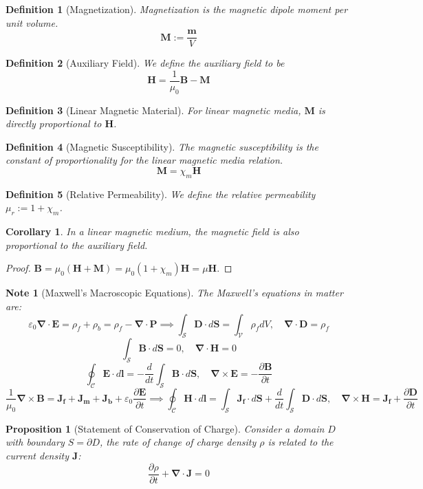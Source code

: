 \documentclass[a4paper]{article}
\newtheorem{defi}{Definition}[section]
\newtheorem{prop}{Proposition}[section]
\newtheorem{cor}{Corollary}[section]
\theoremstyle{new}
\newtheorem{Note}{Note}[section]
\begin{document}
\begin{defi}[Magnetization]
Magnetization is the magnetic dipole moment per unit volume.
$$\mathbf{M}:=\frac{\boldsymbol{m}}{V}$$
\end{defi}
\begin{defi}[Auxiliary Field]
We define the auxiliary field to be
$$\mathbf{H}=\frac{1}{\mu_0}\mathbf{B}-\mathbf{M}$$
\end{defi}
\begin{defi}[Linear Magnetic Material]
For linear magnetic media, $\mathbf{M}$ is directly proportional to $\mathbf{H}$.
\end{defi}
\begin{defi}[Magnetic Susceptibility]
The magnetic susceptibility is the constant of proportionality for the linear magnetic media relation.
$$\mathbf{M}=\chi_m\mathbf{H}$$
\end{defi}
\begin{defi}[Relative Permeability]
We define the relative permeability $\mu_r:=1+\chi_m$.
\end{defi}
\begin{cor}
In a linear magnetic medium, the magnetic field is also proportional to the auxiliary field.
\end{cor}
\begin{proof}
$\mathbf{B}=\mu_0(\mathbf{H}+\mathbf{M})=\mu_0(1+\chi_m)\mathbf{H}=\mu\mathbf{H}$.
\end{proof}
\begin{Note}[Maxwell's Macroscopic Equations]
The Maxwell's equations in matter are:
$$\varepsilon_0\boldsymbol{\nabla}\cdot\mathbf{E}=\rho_f+\rho_b=\rho_f-\boldsymbol{\nabla}\cdot\mathbf{P}\implies\int_{\mathcal{S}}\mathbf{D}\cdot d\mathbf{S}=\int_{\mathcal{V}}\rho_fdV,\quad\boldsymbol{\nabla}\cdot\mathbf{D}=\rho_f$$
$$\int_{\mathcal{S}}\mathbf{B}\cdot d\mathbf{S}=0,\quad \boldsymbol{\nabla}\cdot\mathbf{H}=0$$
$$\oint_{\mathcal{C}}\mathbf{E}\cdot d\mathbf{l}=-\frac{d}{dt}\int_{\mathcal{S}}\mathbf{B}\cdot d\mathbf{S},\quad \boldsymbol{\nabla}\times\mathbf{E}=-\frac{\partial\mathbf{B}}{\partial t}$$
$$\frac{1}{\mu_0}\boldsymbol{\nabla}\times\mathbf{B}=\mathbf{J_f}+\mathbf{J_m}+\mathbf{J_b}+\varepsilon_0\frac{\partial\mathbf{E}}{\partial t}\implies\oint_{\mathcal{C}}\mathbf{H}\cdot d\mathbf{l}=\int_{\mathcal{S}}\mathbf{J_f}\cdot d\mathbf{S}+\frac{d}{dt}\int_{\mathcal{S}}\mathbf{D}\cdot d\mathbf{S},\quad\boldsymbol{\nabla}\times\mathbf{H}=\mathbf{J_f}+\frac{\partial\mathbf{D}}{\partial t}$$
\end{Note}
\begin{prop}[Statement of Conservation of Charge]
Consider a domain $D$ with boundary $S=\partial D$, the rate of change of charge density $\rho$ is related to the current density $\mathbf{J}$:
$$\frac{\partial\rho}{\partial t}+\boldsymbol{\nabla}\cdot\mathbf{J}=0$$
\end{prop}
\end{document}
